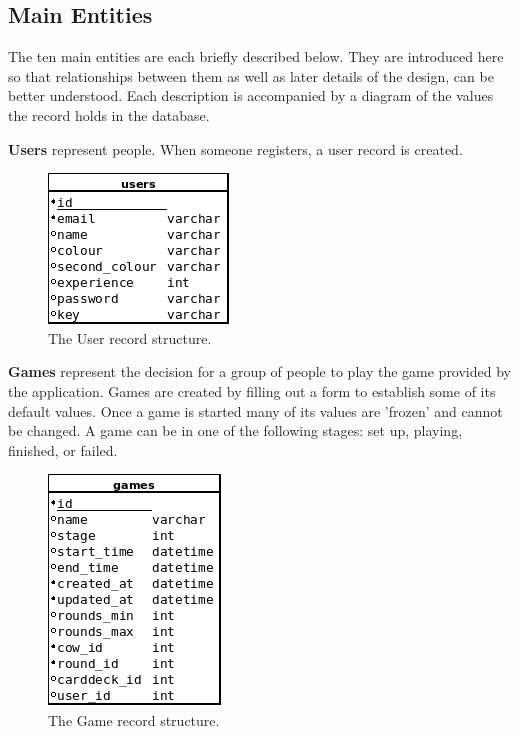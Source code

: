 \subsection{Main Entities}
The ten main entities are each briefly described below. They are introduced here so that relationships between them as well as later details of the design, can be better understood. Each description is accompanied by a diagram of the values the record holds in the database.

\textbf{Users} represent people. When someone registers, a user record is created.
\begin{figure}[ht]
\centering
\includegraphics{Images/2/users}
\caption{The User record structure.}
\label{2_model_user}
\end{figure}

\textbf{Games} represent the decision for a group of people to play the game provided by the application. Games are created by filling out a form to establish some of its default values. Once a game is started many of its values are 'frozen' and cannot be changed. A game can be in one of the following stages: set up, playing, finished, or failed.
\begin{figure}[ht]
\centering
\includegraphics{Images/2/games}
\caption{The Game record structure.}
\label{2_model_game}
\end{figure}

